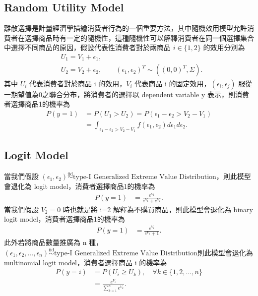 \documentclass[12pt]{article}
\theoremstyle{definition}
\begin{document}
\subsection{Random Utility Model}
離散選擇是計量經濟學描繪消費者行為的一個重要方法，其中隨機效用模型允許消費者在選擇商品時有一定的隨機性，這種隨機性可以解釋消費者在同一個選擇集合中選擇不同商品的原因，假設代表性消費者對於兩商品 $i \in \{1, 2\}$ 的效用分別為
\begin{align*}
    &U_{1} = V_{1} + \epsilon_{1},\\
    &U_{2} = V_{2} + \epsilon_{2}, \qquad (\epsilon_{1}, \epsilon_{2})^T \sim ((0,0)^T, \Sigma).
\end{align*}
其中 $U_{i}$ 代表消費者對於商品 i 的效用，$V_{i}$ 代表商品 i 的固定效用，$(\epsilon_{i}, \epsilon_{j})$ 服從一期望值為0之聯合分布，將消費者的選擇以 dependent variable y 表示，則消費者選擇商品1的機率為
\begin{align*}
    P(y=1) &= P(U_{1} > U_{2}) = P(\epsilon_{1} - \epsilon_{2} > V_{2} - V_{1}) \\ 
    &= \int_{\epsilon_{1} - \epsilon_{2} > V_{2} - V_{1}} f(\epsilon_{1}, \epsilon_{2}) d\epsilon_{1} d\epsilon_{2}.
\end{align*}

\subsection{Logit Model}
當我們假設 $(\epsilon_{1}, \epsilon_{2}) \overset{\mathrm{iid}}{\sim} \text{type-I Generalized Extreme Value Distribution}$，則此模型會退化為 logit model，消費者選擇商品1的機率為
\begin{align*}
    P(y=1) &= \frac{e^{V_{1}}}{e^{V_{1}} + e^{V_{2}}}.
\end{align*}
當我們假設 $V_2=0$ 時也就是將 i=2 解釋為不購買商品，則此模型會退化為 binary logit model，消費者選擇商品1的機率為
\begin{align*}
    P(y=1) &= \frac{e^{V_{1}}}{e^{V_{1}} + 1}.
\end{align*}
此外若將商品數量推廣為 n 種，$(\epsilon_{1}, \epsilon_{2}, ..., \epsilon_{n}) \overset{\mathrm{iid}}{\sim} \text{type-I Generalized Extreme Value Distribution}$則此模型會退化為 multinomial logit model，消費者選擇商品 i 的機率為
\begin{align*}
    P(y = i) &= P(U_i \geq U_k), \quad \forall k \in \{1, 2, ...,n\}\\
    &= \frac{e^{V_{i}}}{\sum_{k=1}^{n} e^{V_{k}}}.
\end{align*}
\end{document}
